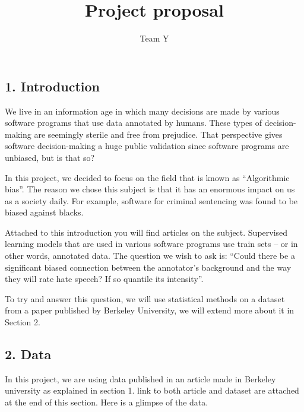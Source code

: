\documentclass[
]{article}
\title{Project proposal}
\author{Team Y}
\date{}
\begin{document}
\maketitle

\hypertarget{introduction}{%
\subsection{1. Introduction}\label{introduction}}

We live in an information age in which many decisions are made by
various software programs that use data annotated by humans. These types
of decision-making are seemingly sterile and free from prejudice. That
perspective gives software decision-making a huge public validation
since software programs are unbiased, but is that so?

In this project, we decided to focus on the field that is known as
``Algorithmic bias''. The reason we chose this subject is that it has an
enormous impact on us as a society daily. For example, software for
criminal sentencing was found to be biased against blacks.

Attached to this introduction you will find articles on the subject.
Supervised learning models that are used in various software programs
use train sets -- or in other words, annotated data. The question we
wish to ask is: ``Could there be a significant biased connection between
the annotator's background and the way they will rate hate speech? If so
quantile its intensity''.

To try and answer this question, we will use statistical methods on a
dataset from a paper published by Berkeley University, we will extend
more about it in Section 2.

\hypertarget{data}{%
\subsection{2. Data}\label{data}}

In this project, we are using data published in an article made in
Berkeley university as explained in section 1. link to both article and
dataset are attached at the end of this section. Here is a glimpse of
the data.
\end{document}
